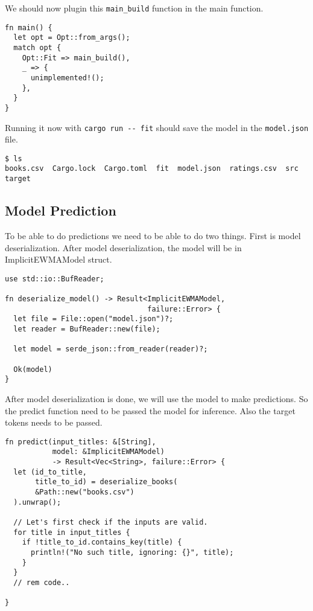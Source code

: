\documentclass{book}
\begin{document}
We should now plugin this \lstinline{main_build} function in the main function.

\begin{lstlisting}[caption={chapter7/goodbooks-recommender/src/main.rs}, basicstyle=\small]
fn main() {
  let opt = Opt::from_args();
  match opt {
    Opt::Fit => main_build(),
    _ => {
      unimplemented!();
    },
  }
}
\end{lstlisting}

Running it now with \lstinline{cargo run -- fit} should save the model in the \lstinline{model.json} file.

\begin{lstlisting}[caption={}, basicstyle=\small]
$ ls
books.csv  Cargo.lock  Cargo.toml  fit  model.json  ratings.csv  src  target
\end{lstlisting}

\label{sub:model_building}
\subsection{Model Prediction}%
To be able to do predictions we need to be able to do two things. First is model deserialization. After model deserialization, the model will be in ImplicitEWMAModel struct.

\begin{lstlisting}[caption={chapter7/goodbooks-recommender/src/main.rs}, basicstyle=\small]
use std::io::BufReader;

fn deserialize_model() -> Result<ImplicitEWMAModel,
                                 failure::Error> {
  let file = File::open("model.json")?;
  let reader = BufReader::new(file);

  let model = serde_json::from_reader(reader)?;

  Ok(model)
}
\end{lstlisting}

After model deserialization is done, we will use the model to make predictions. So the predict function need to be passed the model for inference. Also the target tokens needs to be passed.

\begin{lstlisting}[caption={chapter7/goodbooks-recommender/src/main.rs}, basicstyle=\small]
fn predict(input_titles: &[String],
           model: &ImplicitEWMAModel)
           -> Result<Vec<String>, failure::Error> {
  let (id_to_title,
       title_to_id) = deserialize_books(
       &Path::new("books.csv")
  ).unwrap();

  // Let's first check if the inputs are valid.
  for title in input_titles {
    if !title_to_id.contains_key(title) {
      println!("No such title, ignoring: {}", title);
    }
  }
  // rem code..

}
\end{lstlisting}
\end{document}
